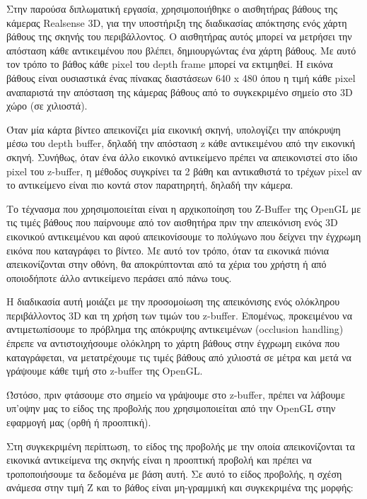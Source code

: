 Στην παρούσα διπλωματική εργασία, χρησιμοποιήθηκε ο αισθητήρας βάθους της κάμερας Realsense 3D, για την υποστήριξη της διαδικασίας απόκτησης ενός χάρτη βάθους της σκηνής του περιβάλλοντος. O αισθητήρας αυτός μπορεί να μετρήσει την απόσταση κάθε αντικειμένου που βλέπει, δημιουργώντας ένα χάρτη βάθους. Με αυτό τον τρόπο το βάθος κάθε pixel του depth frame μπορεί να εκτιμηθεί. Η εικόνα βάθους είναι ουσιαστικά ένας πίνακας διαστάσεων 640 x 480  όπου η τιμή κάθε pixel αναπαριστά την απόσταση της κάμερας βάθους από το συγκεκριμένο σημείο στο 3D χώρο (σε χιλιοστά). 


Όταν μία κάρτα βίντεο απεικονίζει μία εικονική σκηνή, υπολογίζει την απόκρυψη μέσω του depth buffer, δηλαδή την απόσταση z κάθε αντικειμένου από την εικονική σκηνή. Συνήθως, όταν ένα άλλο εικονικό αντικείμενο πρέπει να απεικονιστεί στο ίδιο pixel του z-buffer, η μέθοδος συγκρίνει τα 2 βάθη και αντικαθιστά το τρέχων pixel αν το αντικείμενο είναι πιο κοντά στον παρατηρητή, δηλαδή την κάμερα.

Το τέχνασμα που χρησιμοποιείται είναι η αρχικοποίηση του Z-Buffer της OpenGL με τις τιμές βάθους που παίρνουμε από τον αισθητήρα πριν την απεικόνιση ενός 3D εικονικού αντικειμένου και αφού απεικονίσουμε το πολύγωνο που δείχνει την έγχρωμη εικόνα που καταγράφει το βίντεο. Με αυτό τον τρόπο, όταν τα εικονικά πιόνια απεικονίζονται στην οθόνη, θα αποκρύπτονται από τα χέρια του χρήστη ή από οποιοδήποτε άλλο αντικείμενο περάσει από πάνω τους. 

Η διαδικασία αυτή μοιάζει με την προσομοίωση της απεικόνισης ενός ολόκληρου περιβάλλοντος 3D και τη χρήση των τιμών του z-buffer. Eπομένως, προκειμένου να αντιμετωπίσουμε το πρόβλημα της απόκρυψης αντικειμένων (occlusion handling) έπρεπε να αντιστοιχήσουμε ολόκληρη το χάρτη βάθους στην έγχρωμη εικόνα που καταγράφεται, να μετατρέχουμε τις τιμές βάθους από χιλιοστά σε μέτρα και μετά να γράψουμε κάθε τιμή στο z-buffer της OpenGL.


Ώστόσο, πριν φτάσουμε στο σημείο να γράψουμε στο z-buffer, πρέπει να λάβουμε υπ'οψην μας το είδος της προβολής που χρησιμοποιείται από την OpenGL στην εφαρμογή μας (ορθή ή προοπτική). 


Στη συγκεκριμένη περίπτωση, το είδος της προβολής με την οποία απεικονίζονται τα εικονικά αντικείμενα της σκηνής είναι η προοπτική προβολή και πρέπει να τροποποιήσουμε τα δεδομένα με βάση αυτή. Σε αυτό το είδος προβολής, η σχέση ανάμεσα στην τιμή Z και το βάθος είναι μη-γραμμική και συγκεκριμένα της μορφής:



